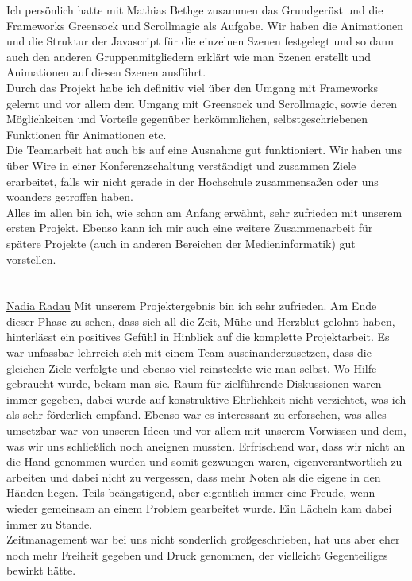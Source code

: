 Ich persönlich hatte mit Mathias Bethge zusammen das Grundgerüst und die Frameworks Greensock und Scrollmagic als Aufgabe. Wir haben die Animationen und die Struktur der Javascript für die einzelnen Szenen festgelegt und so dann auch den anderen Gruppenmitgliedern erklärt wie man Szenen erstellt und Animationen auf diesen Szenen ausführt.\\
Durch das Projekt habe ich definitiv viel über den Umgang mit Frameworks gelernt und vor allem dem Umgang mit Greensock und Scrollmagic, sowie deren Möglichkeiten und Vorteile gegenüber herkömmlichen, selbstgeschriebenen Funktionen für Animationen etc. \\
Die Teamarbeit hat auch bis auf eine Ausnahme gut funktioniert. Wir haben uns über Wire in einer Konferenzschaltung verständigt und zusammen Ziele erarbeitet, falls wir nicht gerade in der Hochschule zusammensaßen oder uns woanders getroffen haben. \\
Alles im allen bin ich, wie schon am Anfang erwähnt, sehr zufrieden mit unserem ersten Projekt.
Ebenso kann ich mir auch eine weitere Zusammenarbeit für spätere Projekte (auch in anderen Bereichen der Medieninformatik) gut vorstellen.\\
\\
\\
\underline{Nadia Radau}
Mit unserem Projektergebnis bin ich sehr zufrieden. Am Ende dieser Phase zu sehen, dass sich all die Zeit, Mühe und Herzblut gelohnt haben, hinterlässt ein positives Gefühl in Hinblick auf die komplette Projektarbeit. Es war unfassbar lehrreich sich mit einem Team auseinanderzusetzen, dass die gleichen Ziele verfolgte und ebenso viel reinsteckte wie man selbst. Wo Hilfe gebraucht wurde, bekam man sie. Raum für zielführende Diskussionen waren immer gegeben, dabei wurde auf konstruktive Ehrlichkeit nicht verzichtet, was ich als sehr förderlich empfand. Ebenso war es interessant zu erforschen, was alles umsetzbar war von unseren Ideen und vor allem mit unserem Vorwissen und dem, was wir uns schließlich noch aneignen mussten. Erfrischend war, dass wir nicht an die Hand genommen wurden und somit gezwungen waren, eigenverantwortlich zu arbeiten und dabei nicht zu vergessen, dass mehr Noten als die eigene in den Händen liegen. Teils beängstigend, aber eigentlich immer eine Freude, wenn wieder gemeinsam an einem Problem gearbeitet wurde. Ein Lächeln kam dabei immer zu Stande.\\
Zeitmanagement war bei uns nicht sonderlich großgeschrieben, hat uns aber eher noch mehr Freiheit gegeben und Druck genommen, der vielleicht Gegenteiliges bewirkt hätte.\\
